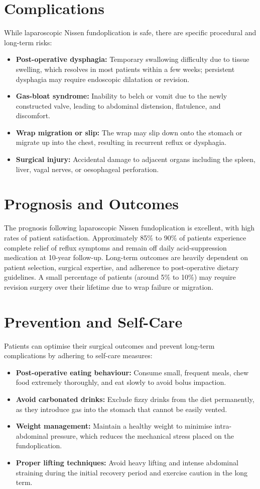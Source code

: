 \section*{Complications}
While laparoscopic Nissen fundoplication is safe, there are specific procedural and long-term risks:
\begin{itemize}
    \item \textbf{Post-operative dysphagia:} Temporary swallowing difficulty due to tissue swelling, which resolves in most patients within a few weeks; persistent dysphagia may require endoscopic dilatation or revision.
    \item \textbf{Gas-bloat syndrome:} Inability to belch or vomit due to the newly constructed valve, leading to abdominal distension, flatulence, and discomfort.
    \item \textbf{Wrap migration or slip:} The wrap may slip down onto the stomach or migrate up into the chest, resulting in recurrent reflux or dysphagia.
    \item \textbf{Surgical injury:} Accidental damage to adjacent organs including the spleen, liver, vagal nerves, or oesophageal perforation.
\end{itemize}

\section*{Prognosis and Outcomes}
The prognosis following laparoscopic Nissen fundoplication is excellent, with high rates of patient satisfaction. Approximately 85\% to 90\% of patients experience complete relief of reflux symptoms and remain off daily acid-suppression medication at 10-year follow-up. Long-term outcomes are heavily dependent on patient selection, surgical expertise, and adherence to post-operative dietary guidelines. A small percentage of patients (around 5\% to 10\%) may require revision surgery over their lifetime due to wrap failure or migration.

\section*{Prevention and Self-Care}
Patients can optimise their surgical outcomes and prevent long-term complications by adhering to self-care measures:
\begin{itemize}
    \item \textbf{Post-operative eating behaviour:} Consume small, frequent meals, chew food extremely thoroughly, and eat slowly to avoid bolus impaction.
    \item \textbf{Avoid carbonated drinks:} Exclude fizzy drinks from the diet permanently, as they introduce gas into the stomach that cannot be easily vented.
    \item \textbf{Weight management:} Maintain a healthy weight to minimise intra-abdominal pressure, which reduces the mechanical stress placed on the fundoplication.
    \item \textbf{Proper lifting techniques:} Avoid heavy lifting and intense abdominal straining during the initial recovery period and exercise caution in the long term.
\end{itemize}

